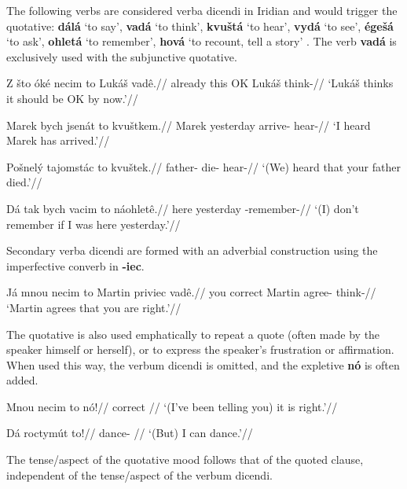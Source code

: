 \par The following verbs are considered verba dicendi in Iridian and would trigger the quotative: \textbf{dálá} `to say', \textbf{vadá} `to think', \textbf{kvu\v{s}tá} `to hear', \textbf{vydá} `to see', \textbf{ége\v{s}á} `to ask', \textbf{ohletá} `to remember', \textbf{hová} `to recount, tell a story' . The verb \textbf{vadá} is exclusively used with the subjunctive quotative.

\pex
\begingl
\gla Z \v{s}to óké necim to Luká\v{s} vadê.//
\glb already this OK   Luká\v{s} think-//
\glft `Luká\v{s} thinks it should be OK by now.'//
\endgl
\xe

\pex
\begingl
\gla Marek bych jsenát to kvu\v{s}tkem.//
\glb Marek yesterday arrive-  hear-//
\glft `I heard Marek has arrived.'//
\endgl
\xe


\pex
\begingl
\gla Po\v{s}nelý tajomstác to kvu\v{s}tek.//
\glb father- die-  hear-//
\glft `(We) heard that your father died.'//
\endgl
\xe

\pex
\begingl
\gla Dá tak bych vacim to náohletê.//
\glb {} here yesterday   -remember-//
\glft `(I) don't remember if I was here yesterday.'//
\endgl
\xe

\par Secondary verba dicendi are formed with an adverbial construction using the imperfective converb in \textbf{-iec}.

\pex
\begingl
\gla Já mnou necim to Martin priviec vadê.//
\glb you correct   Martin agree- think-//
\glft `Martin agrees that you are right.'//
\endgl
\xe

\par The quotative is also used emphatically to repeat a quote (often made by the speaker himself or herself), or to express the speaker's frustration or affirmation. When used this way, the verbum dicendi is omitted, and the expletive \textbf{nó} is often added.

\pex
\begingl
\gla Mnou necim to nó!//
\glb correct   //
\glft `(I've been telling you) it is right.'//
\endgl
\xe

\pex
\begingl
\gla Dá roctymút to!//
\glb {} dance- //
\glft `(But) I can dance.'//
\endgl
\xe

\par The tense/aspect of the quotative mood follows that of the quoted clause, independent of the tense/aspect of the verbum dicendi.



